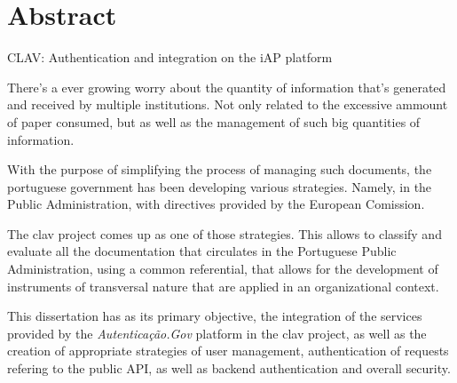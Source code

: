 \chapter*{Abstract}

\large{CLAV: Authentication and integration on the iAP platform}
\vspace{5mm}

There's a ever growing worry about the quantity of information that's generated and received by multiple institutions. Not only related to the excessive ammount of paper consumed, but as well as the management of such big quantities of information.

With the purpose of simplifying the process of managing such documents, the portuguese government has been developing various strategies. Namely, in the Public Administration, with directives provided by the European Comission.

The \gls{clav} project comes up as one of those strategies. This allows to classify and evaluate all the documentation that circulates in the Portuguese Public Administration, using a common referential, that allows for the development of instruments of transversal nature that are applied in an organizational context.

This dissertation has as its primary objective, the integration of the services provided by the \emph{Autenticação.Gov} platform in the \gls{clav} project, as well as the creation of appropriate strategies of user management, authentication of requests refering to the public API, as well as  backend authentication and overall security.

\vspace{5cm}
